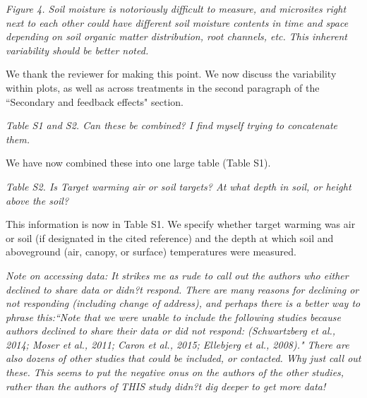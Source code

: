 \documentclass[11pt,a4paper]{letter}
\begin{document}
\par \emph{Figure 4.  Soil moisture is notoriously difficult to measure, and microsites right next to each other could have different soil moisture contents in time and space depending on soil organic matter distribution, root channels, etc.  This inherent variability should be better noted.}
\par We thank the reviewer for making this point. We now discuss the variability within plots, as well as across treatments in the second paragraph of the ``Secondary and feedback effects" section. 

\par \emph{Table S1 and S2.  Can these be combined?  I find myself trying to concatenate them.}
\par We have now combined these into one large table (Table S1).

\par \emph{Table S2.  Is Target warming air or soil targets?  At what depth in soil, or height above the soil?}

\par This information is now in Table S1. We specify whether target warming was air or soil (if designated in the cited reference) and the depth at which soil and aboveground (air, canopy, or surface) temperatures were measured. 

\par \emph{Note on accessing data:  It strikes me as rude to call out the authors who either declined to share data or didn?t respond.  There are many reasons for declining or not responding (including change of address), and perhaps there is a better way to phrase this:``Note that we were unable to include the following studies because authors declined to share their data or did not respond: (Schwartzberg et al., 2014; Moser et al., 2011; Caron et al., 2015; Ellebjerg et al., 2008)." There are also dozens of other studies that could be included, or contacted.  Why just call out these.  This seems to put the negative onus on the authors of the other studies, rather than the authors of THIS study didn?t dig deeper to get more data!}
\end{document}
